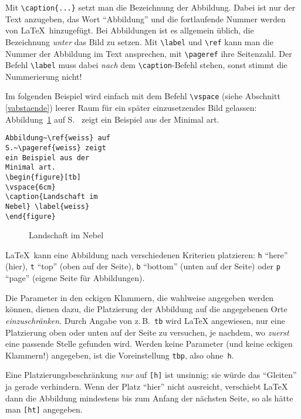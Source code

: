 Mit \lstinline|\caption{...}| setzt man die Bezeichnung der Abbildung.
Dabei ist nur der Text anzugeben, das Wort "`Abbildung"' und die
fortlaufende Nummer werden von \LaTeX\ hinzugefügt.
Bei Abbildungen ist es allgemein üblich, die Bezeichnung
\emph{unter} das Bild zu setzen.
Mit \lstinline|\label| und \lstinline|\ref| kann man die Nummer der
Abbildung im Text ansprechen, mit \lstinline|\pageref| ihre Seitenzahl.
Der Befehl \lstinline:\label: muss dabei \emph{nach} dem \lstinline:\caption:-Befehl
stehen, sonst stimmt die Nummerierung nicht!

Im folgenden Beispiel wird einfach mit dem Befehl \lstinline|\vspace|
(siehe Abschnitt \ref{vabstaende})
leerer Raum für ein später einzusetzendes Bild gelassen:
\exa
Abbildung~\ref{weiss} auf S.~\pageref{weiss} zeigt ein
Beispiel aus der Minimal art.
\exb
\begin{verbatim}
Abbildung~\ref{weiss} auf
S.~\pageref{weiss} zeigt
ein Beispiel aus der 
Minimal art.
\begin{figure}[tb]
\vspace{6cm}
\caption{Landschaft im
Nebel} \label{weiss}
\end{figure}
\end{verbatim}
\exc
\begin{figure}[tb]
\vspace{6cm}
\caption{Landschaft im
Nebel} \label{weiss}
\end{figure}

\LaTeX\ kann eine Abbildung nach verschiedenen Kriterien platzieren:
\texttt{h} "`here"' (hier),
\texttt{t} "`top"' (oben auf der Seite), \texttt{b} "`bottom"' (unten
auf der Seite) oder \texttt{p} "`page"' (eigene Seite für
Abbildungen).

Die Parameter in den eckigen Klammern, die wahlweise angegeben
werden können, dienen dazu, die Platzierung der Abbildung auf die
angegebenen Orte \emph{einzuschränken}.  Durch Angabe von
z.\,B.\ \texttt{tb}
wird \LaTeX{} angewiesen, nur eine Platzierung oben oder unten auf der
Seite zu versuchen, je nachdem,
wo \emph{zuerst} eine passende Stelle gefunden wird.
Werden keine Parameter (und keine eckigen
Klammern!) angegeben, ist die Voreinstellung \texttt{tbp},
also ohne~\texttt{h}.

Eine Platzierungsbeschränkung \emph{nur} auf \texttt{[h]} ist unsinnig;
sie würde das "`Gleiten"' ja gerade verhindern.
Wenn der Platz "`hier"' nicht ausreicht, 
verschiebt \LaTeX{} dann die Abbildung mindestens 
bis zum Anfang der nächsten Seite, so als hätte man \texttt{[ht]} angegeben.

